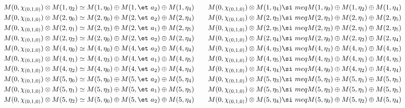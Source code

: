 \begin{align*}
M(0,\chi_{(0,1,0)}) &\otimes M(1,\eta_{2}) \simeq M(1,\eta_{0}) \oplus M(1,\et\
a_{2}) \oplus M(1,\eta_{4}) &&& M(0,\chi_{(0,1,0)}) &\otimes M(1,\eta_{4}) \si\
meq M(1,\eta_{0}) \oplus M(1,\eta_{2}) \oplus M(1,\eta_{4})\\
M(0,\chi_{(0,1,0)}) &\otimes M(2,\eta_{0}) \simeq M(2,\eta_{0}) \oplus M(2,\et\
a_{2}) \oplus M(2,\eta_{4}) &&& M(0,\chi_{(0,1,0)}) &\otimes M(2,\eta_{3}) \si\
meq M(2,\eta_{3}) \oplus M(2,\eta_{1}) \oplus M(2,\eta_{5})\\
M(0,\chi_{(0,1,0)}) &\otimes M(2,\eta_{1}) \simeq M(2,\eta_{3}) \oplus M(2,\et\
a_{1}) \oplus M(2,\eta_{5}) &&& M(0,\chi_{(0,1,0)}) &\otimes M(2,\eta_{5}) \si\
meq M(2,\eta_{3}) \oplus M(2,\eta_{1}) \oplus M(2,\eta_{5})\\
M(0,\chi_{(0,1,0)}) &\otimes M(2,\eta_{2}) \simeq M(2,\eta_{0}) \oplus M(2,\et\
a_{2}) \oplus M(2,\eta_{4}) &&& M(0,\chi_{(0,1,0)}) &\otimes M(2,\eta_{4}) \si\
meq M(2,\eta_{0}) \oplus M(2,\eta_{2}) \oplus M(2,\eta_{4})\\
M(0,\chi_{(0,1,0)}) &\otimes M(4,\eta_{0}) \simeq M(4,\eta_{0}) \oplus M(4,\et\
a_{2}) \oplus M(4,\eta_{4}) &&& M(0,\chi_{(0,1,0)}) &\otimes M(4,\eta_{3}) \si\
meq M(4,\eta_{3}) \oplus M(4,\eta_{1}) \oplus M(4,\eta_{5})\\
M(0,\chi_{(0,1,0)}) &\otimes M(4,\eta_{1}) \simeq M(4,\eta_{3}) \oplus M(4,\et\
a_{1}) \oplus M(4,\eta_{5}) &&& M(0,\chi_{(0,1,0)}) &\otimes M(4,\eta_{5}) \si\
meq M(4,\eta_{3}) \oplus M(4,\eta_{1}) \oplus M(4,\eta_{5})\\
M(0,\chi_{(0,1,0)}) &\otimes M(4,\eta_{2}) \simeq M(4,\eta_{0}) \oplus M(4,\et\
a_{2}) \oplus M(4,\eta_{4}) &&& M(0,\chi_{(0,1,0)}) &\otimes M(4,\eta_{4}) \si\
meq M(4,\eta_{0}) \oplus M(4,\eta_{2}) \oplus M(4,\eta_{4})\\
M(0,\chi_{(0,1,0)}) &\otimes M(5,\eta_{0}) \simeq M(5,\eta_{0}) \oplus M(5,\et\
a_{2}) \oplus M(5,\eta_{4}) &&& M(0,\chi_{(0,1,0)}) &\otimes M(5,\eta_{3}) \si\
meq M(5,\eta_{3}) \oplus M(5,\eta_{1}) \oplus M(5,\eta_{5})\\
M(0,\chi_{(0,1,0)}) &\otimes M(5,\eta_{1}) \simeq M(5,\eta_{3}) \oplus M(5,\et\
a_{1}) \oplus M(5,\eta_{5}) &&& M(0,\chi_{(0,1,0)}) &\otimes M(5,\eta_{5}) \si\
meq M(5,\eta_{3}) \oplus M(5,\eta_{1}) \oplus M(5,\eta_{5})\\
M(0,\chi_{(0,1,0)}) &\otimes M(5,\eta_{2}) \simeq M(5,\eta_{0}) \oplus M(5,\et\
a_{2}) \oplus M(5,\eta_{4}) &&& M(0,\chi_{(0,1,0)}) &\otimes M(5,\eta_{4}) \si\
meq M(5,\eta_{0}) \oplus M(5,\eta_{2}) \oplus M(5,\eta_{4})\\
\end{align*}

